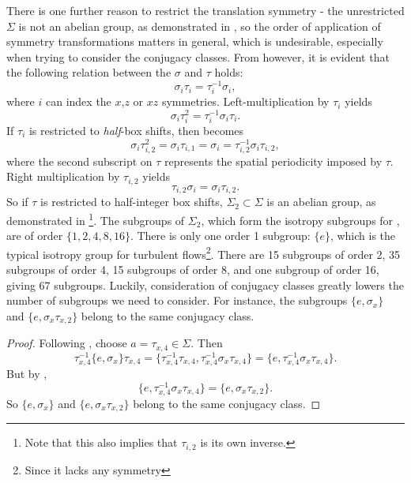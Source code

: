 There is one further reason to restrict the translation symmetry - the unrestricted $\Sigma$ is not an abelian group, as demonstrated in , so the order of application of symmetry transformations matters in general, which is undesirable, especially when trying to consider the conjugacy classes. From  however, it is evident that the following relation between the $\sigma$ and $\tau$ holds:
\begin{equation}
\sigma_{i}\tau_{i} = \tau_i^{-1}\sigma_i,
\end{equation}
where $i$ can index the $x$,$z$ or $xz$ symmetries. Left-multiplication by $\tau_i$ yields
\begin{equation}\label{eq:pscom}
\sigma_i\tau_i^2 = \tau_i^{-1}\sigma_i\tau_i.
\end{equation}
If $\tau_i$ is restricted to \emph{half}-box shifts, then  becomes
\begin{equation}
\sigma_i\tau_{i,2}^2 = \sigma_i\tau_{i,1} = \sigma_i = \tau_{i,2}^{-1}\sigma_{i}\tau_{i,2},
\end{equation}
where the second subscript on $\tau$ represents the spatial periodicity imposed by $\tau$. Right multiplication by $\tau_{i,2}$ yields
\begin{equation}
\tau_{i,2}\sigma_{i} = \sigma_{i}\tau_{i,2}.
\end{equation}
So if $\tau$ is restricted to half-integer box shifts, $\Sigma_2 \subset \Sigma$ is an abelian group, as demonstrated in \footnote{Note that this also implies that $\tau_{i,2}$ is its own inverse.}. The subgroups of $\Sigma_2$, which form the isotropy subgroups for \pCf, are of order $\{1,2,4,8,16\}$. There is only one order 1 subgroup: $\{ e \}$, which is the typical isotropy group for turbulent flows\footnote{Since it lacks any symmetry}. There are 15 subgroups of order 2, 35 subgroups of order 4, 15 subgroups of order 8, and one subgroup of order 16, giving 67 subgroups. Luckily, consideration of conjugacy classes greatly lowers the number of subgroups we need to consider. For instance, the subgroups $\{ e, \sigma_x\}$ and $\{e, \sigma_x\tau_{x,2}\}$ belong to the same conjugacy class.
\begin{proof}
Following , choose $a = \tau_{x,4} \in \Sigma$. Then
\begin{equation}
\tau_{x,4}^{-1}\{ e, \sigma_x\}\tau_{x,4} = \{ \tau_{x,4}^{-1}\tau_{x,4},\tau_{x,4}^{-1}\sigma_x\tau_{x,4}\} =\{e,\tau_{x,4}^{-1}\sigma_x\tau_{x,4}\} .
\end{equation}
But by ,
\begin{equation}
\{ e,\tau_{x,4}^{-1}\sigma_x\tau_{x,4}\} = \{ e, \sigma_x\tau_{x,2}\}.
\end{equation}
So $\{ e, \sigma_x\}$ and $\{e, \sigma_x\tau_{x,2}\}$ belong to the same conjugacy class.
\end{proof}

